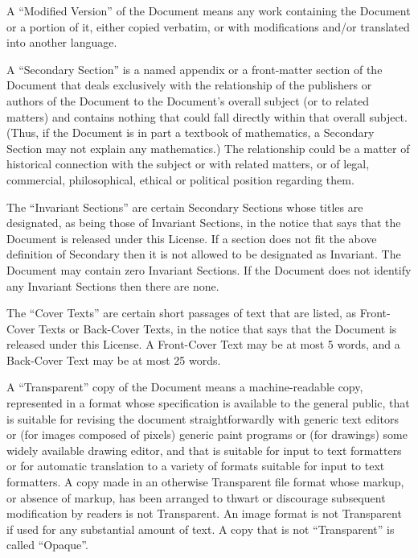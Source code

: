 {\tiny{}A \textquotedblleft Modified Version'' of the Document means
any work containing the Document or a portion of it, either copied
verbatim, or with modifications and/or translated into another language.}{\tiny\par}

{\tiny{}A \textquotedblleft Secondary Section'' is a named appendix
or a front-matter section of the Document that deals exclusively with
the relationship of the publishers or authors of the Document to the
Document's overall subject (or to related matters) and contains nothing
that could fall directly within that overall subject. (Thus, if the
Document is in part a textbook of mathematics, a Secondary Section
may not explain any mathematics.) The relationship could be a matter
of historical connection with the subject or with related matters,
or of legal, commercial, philosophical, ethical or political position
regarding them.}{\tiny\par}

{\tiny{}The \textquotedblleft Invariant Sections'' are certain Secondary
Sections whose titles are designated, as being those of Invariant
Sections, in the notice that says that the Document is released under
this License. If a section does not fit the above definition of Secondary
then it is not allowed to be designated as Invariant. The Document
may contain zero Invariant Sections. If the Document does not identify
any Invariant Sections then there are none.}{\tiny\par}

{\tiny{}The \textquotedblleft Cover Texts'' are certain short passages
of text that are listed, as Front-Cover Texts or Back-Cover Texts,
in the notice that says that the Document is released under this License.
A Front-Cover Text may be at most 5 words, and a Back-Cover Text may
be at most 25 words.}{\tiny\par}

{\tiny{}A \textquotedblleft Transparent'' copy of the Document means
a machine-readable copy, represented in a format whose specification
is available to the general public, that is suitable for revising
the document straightforwardly with generic text editors or (for images
composed of pixels) generic paint programs or (for drawings) some
widely available drawing editor, and that is suitable for input to
text formatters or for automatic translation to a variety of formats
suitable for input to text formatters. A copy made in an otherwise
Transparent file format whose markup, or absence of markup, has been
arranged to thwart or discourage subsequent modification by readers
is not Transparent. An image format is not Transparent if used for
any substantial amount of text. A copy that is not \textquotedblleft Transparent''
is called \textquotedblleft Opaque''.}{\tiny\par}

